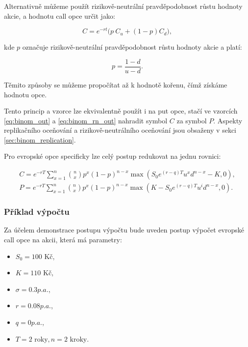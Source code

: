 \documentclass[male,czech,api_bc]{kitheses}
\begin{document}
 Alternativně můžeme použít rizikově-neutrální pravděpodobnost růstu hodnoty akcie, a hodnotu call opce určit jako:

  \begin{equation}
    \label{eq:binom_rn_out}
    C = e^{-rt}\bigl(p\ C_u + (1-p) C_d\bigr),
  \end{equation}

  kde $p$ označuje rizikově-neutrální pravděpodobnost růstu hodnoty akcie a platí:

  \begin{equation}
    p = \frac{1 - d}{u - d}.
  \end{equation}

  Těmito způsoby se můžeme propočítat až k hodnotě kořenu, čímž získáme hodnotu opce.

  Tento princip a vzorce lze ekvivalentně použít i na put opce, stačí ve vzorcích \eqref{eq:binom_out} a \eqref{eq:binom_rn_out} nahradit symbol $C$ za symbol $P$.
  Aspekty replikačního oceňování a rizikově-neutrálního oceňování jsou obsaženy v sekci \ref{sec:binom_replication}.

  Pro evropské opce specificky lze celý postup redukovat na jednu rovnici:

  \begin{gather}
    C = e^{-rT} \sum_{x=1}^{n} \binom{n}{x} p^x (1 - p)^{n - x} \max(S_0 e^{(r-q)T} u^x d^{n-x} - K, 0), \\
    P = e^{-rT} \sum_{x=1}^{n} \binom{n}{x} p^x (1 - p)^{n - x} \max(K - S_0 e^{(r-q)T} u^i d^{n-x}, 0).
  \end{gather}

  \parencites[rovnice~7.1,7.2]{Haug2007}


  \subsubsection{Příklad výpočtu}

  Za účelem demonstrace postupu výpočtu bude uveden postup výpočet evropské call opce na akcii, která má parametry:
  \begin{itemize}
    \item $S_0 = 100$ Kč,
    \item $K = 110$ Kč,
    \item $\sigma = 0.3 p.a.$,
    \item $r = 0.08 p.a.$,
    \item $q = 0 p.a.$,
    \item $T = 2\text{ roky}, n = 2\text{ kroky}$.
  \end{itemize}
\end{document}
